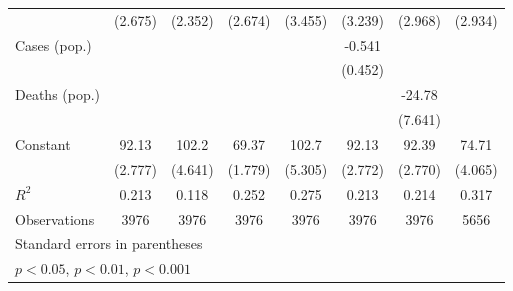 \documentclass{article}
\begin{document}
{\begin{longtable}{l*{7}{c}}
                &  (2.675)         &  (2.352)         &  (2.674)         &  (3.455)         &  (3.239)         &  (2.968)         &  (2.934)         \\
Cases (pop.)    &                  &                  &                  &                  &   -0.541         &                  &                  \\
                &                  &                  &                  &                  &  (0.452)         &                  &                  \\
Deaths (pop.)   &                  &                  &                  &                  &                  &   -24.78\sym{**} &                  \\
                &                  &                  &                  &                  &                  &  (7.641)         &                  \\
Constant        &    92.13\sym{***}&    102.2\sym{***}&    69.37\sym{***}&    102.7\sym{***}&    92.13\sym{***}&    92.39\sym{***}&    74.71\sym{***}\\
                &  (2.777)         &  (4.641)         &  (1.779)         &  (5.305)         &  (2.772)         &  (2.770)         &  (4.065)         \\
\hline
\(R^{2}\)       &    0.213         &    0.118         &    0.252         &    0.275         &    0.213         &    0.214         &    0.317         \\
Observations    &     3976         &     3976         &     3976         &     3976         &     3976         &     3976         &     5656         \\
\hline\hline
\multicolumn{8}{l}{\footnotesize Standard errors in parentheses}\\
\multicolumn{8}{l}{\footnotesize \sym{*} \(p<0.05\), \sym{**} \(p<0.01\), \sym{***} \(p<0.001\)}\\
\end{longtable}
}
\end{document}

